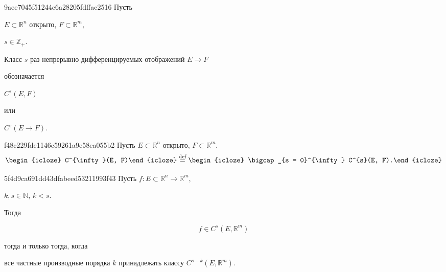 \begin{note}{9aee7045f51244c6a28205fdffac2516}
    Пусть \begin{icloze}{3}\({ E \subset \mathbb R^{n} }\) открыто,\: \({ F \subset \mathbb R^{m} }\),\end{icloze}\: \begin{icloze}{3}\({ s \in \mathbb Z_+ }\).\end{icloze} \begin{icloze}{2}Класс \({ s }\) раз непрерывно дифференцируемых отображений \({ E \to F }\)\end{icloze} обозначается
    \begin{center}
        \begin{icloze}{1}\({ C^{s}(E, F) }\)\end{icloze} или \begin{icloze}{1}\({ C^{s}(E \to F) }\).\end{icloze}
    \end{center}
\end{note}

\begin{note}{f48c229fde1146c59261a9e58ea055b2}
    Пусть \({ E \subset \mathbb R^{n} }\) открыто,\: \({ F \subset \mathbb R^{m} }\).
    \[
        \begin{icloze}{2}C^{\infty}(E, F)\end{icloze} \overset{\text{def}}= \begin{icloze}{1}\bigcap_{s = 0}^{\infty} C^{s}(E, F).\end{icloze}
    \]
\end{note}

\begin{note}{5f4d9ca691dd43dfabeed53211993f43}
    Пусть \({ f : E \subset \mathbb R^{n} \to \mathbb R^{m} }\),\: \begin{icloze}{4}\({ k, s \in \mathbb N }\),\: \({ k < s }\).\end{icloze}
    Тогда
    \begin{icloze}{2}
        \[
            f \in C^{s}(E, \mathbb R^{m})
        \]
    \end{icloze}
    \begin{icloze}{3}тогда и только тогда, когда\end{icloze} \begin{icloze}{1}все частные производные порядка \({ k }\) принадлежать классу \({ C^{s - k}(E, \mathbb R^{m}) }\).\end{icloze}
\end{note}

